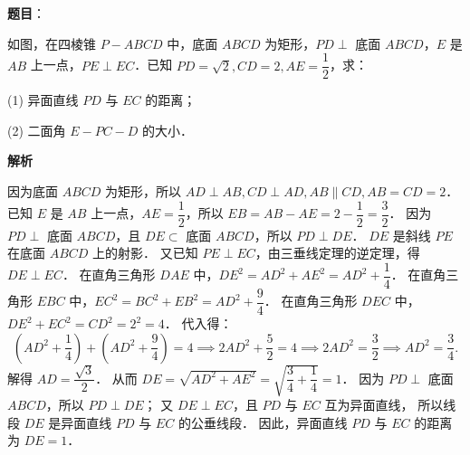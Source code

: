 \begin{answer}

\textbf{题目}：

如图，在四棱锥 $P - ABCD$ 中，底面 $ABCD$ 为矩形，$PD \perp$ 底面 $ABCD$，$E$ 是 $AB$ 上一点，$PE \perp EC$．已知 $PD = \sqrt{2}, CD = 2, AE = \dfrac{1}{2}$，求：
\nopagebreak[4]
\begin{center}\end{center}
\nopagebreak[4]
(1) 异面直线 $PD$ 与 $EC$ 的距离；

(2) 二面角 $E - PC - D$ 的大小．

\textbf{解析}


因为底面 $ABCD$ 为矩形，所以 $AD \perp AB, CD \perp AD, AB \parallel CD, AB = CD = 2$．
已知 $E$ 是 $AB$ 上一点，$AE = \dfrac{1}{2}$，所以 $EB = AB - AE = 2 - \dfrac{1}{2} = \dfrac{3}{2}$．
因为 $PD \perp$ 底面 $ABCD$，且 $DE \subset$ 底面 $ABCD$，所以 $PD \perp DE$．
$DE$ 是斜线 $PE$ 在底面 $ABCD$ 上的射影．
又已知 $PE \perp EC$，由三垂线定理的逆定理，得 $DE \perp EC$．
在直角三角形 $DAE$ 中，$DE^2 = AD^2 + AE^2 = AD^2 + \dfrac{1}{4}$．
在直角三角形 $EBC$ 中，$EC^2 = BC^2 + EB^2 = AD^2 + \dfrac{9}{4}$．
在直角三角形 $DEC$ 中，$DE^2 + EC^2 = CD^2 = 2^2 = 4$．
代入得：
\nopagebreak[4]
\[
\left(AD^2 + \frac{1}{4}\right) + \left(AD^2 + \frac{9}{4}\right) = 4 \implies 2AD^2 + \frac{5}{2} = 4 \implies 2AD^2 = \frac{3}{2} \implies AD^2 = \frac{3}{4}.
\]
解得 $AD = \dfrac{\sqrt{3}}{2}$．
从而 $DE = \sqrt{AD^2 + AE^2} = \sqrt{\dfrac{3}{4} + \dfrac{1}{4}} = 1$．
因为 $PD \perp$ 底面 $ABCD$，所以 $PD \perp DE$；
又 $DE \perp EC$，且 $PD$ 与 $EC$ 互为异面直线，
所以线段 $DE$ 是异面直线 $PD$ 与 $EC$ 的公垂线段．
因此，异面直线 $PD$ 与 $EC$ 的距离为 $DE = 1$．



\end{answer}
